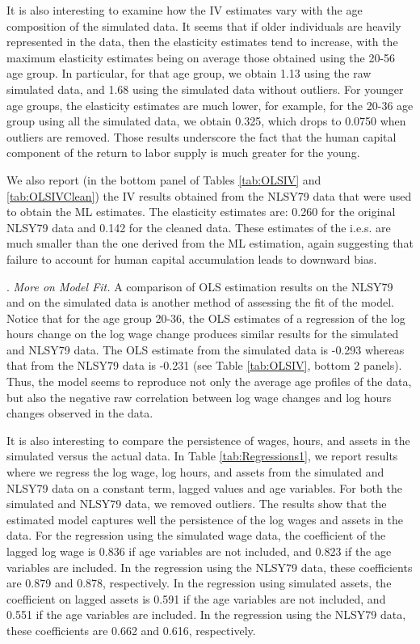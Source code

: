 \documentclass{article}
\begin{document}
      It is also interesting to examine how the IV estimates vary with the age composition of the simulated data. It seems that if older individuals are heavily represented in the data, then the elasticity estimates tend to increase, with the maximum elasticity estimates being on average those obtained using the 20-56 age group. In particular, for that age group, we obtain 1.13 using the raw simulated data, and 1.68 using the simulated data without outliers. For younger age groups, the elasticity estimates are much lower, for example, for the 20-36 age group using all the simulated data, we obtain 0.325, which drops to 0.0750 when outliers are removed. Those results underscore the fact that the human capital component of the return to labor supply is much greater for the young. \par
      We also report (in the bottom panel of Tables \ref{tab:OLSIV} and \ref{tab:OLSIVClean}) the IV results obtained from the NLSY79 data that were used to obtain the ML estimates. The elasticity estimates are: 0.260 for the original NLSY79 data and 0.142 for the cleaned data. These estimates of the i.e.s. are much smaller than the one derived from the ML estimation, again suggesting that failure to account for human capital accumulation leads to downward bias.\par
{}.     \textit{More on Model Fit.}     A comparison of OLS estimation results on the NLSY79 and on the simulated data is another method of assessing the fit of the model. Notice that for the age group 20-36, the OLS estimates of a regression of the log hours change on the log wage change produces similar results for the simulated and NLSY79 data. The OLS estimate from the simulated data is -0.293 whereas that from the NLSY79 data is -0.231 (see Table \ref{tab:OLSIV}, bottom 2 panels). Thus, the model seems to reproduce not only the average age profiles of the data, but also the negative raw correlation between log wage changes and log hours changes observed in the data. \par
      
      
      It is also interesting to compare the persistence of wages, hours, and assets in the simulated versus the actual data. In Table \ref{tab:Regressions1}, we report results where we regress the log wage, log hours, and assets from the simulated and NLSY79 data on a constant term, lagged values and age variables. For both the simulated and NLSY79 data, we removed outliers. The results show that the estimated model captures well the persistence of the log wages and assets in the data. For the regression using the simulated wage data, the coefficient of the lagged log wage is 0.836 if age variables are not included, and 0.823 if the age variables are included. In the regression using the NLSY79 data, these coefficients are 0.879 and 0.878, respectively. In the regression using simulated assets, the coefficient on lagged assets is 0.591 if the age variables are not included, and 0.551 if the age variables are included. In the regression using the NLSY79 data, these coefficients are 0.662 and 0.616, respectively. \par
\end{document}
